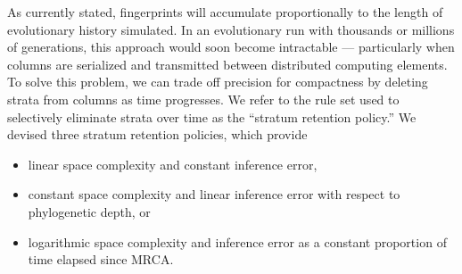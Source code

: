 As currently stated, fingerprints will accumulate proportionally to the length of evolutionary history simulated.
In an evolutionary run with thousands or millions of generations, this approach would soon become intractable --- particularly when columns are serialized and transmitted between distributed computing elements.
To solve this problem, we can trade off precision for compactness by deleting strata from columns as time progresses.
%
%
We refer to the rule set used to selectively eliminate strata over time as the ``stratum retention policy.''
We devised three stratum retention policies, which provide
\begin{itemize}
  \item linear space complexity and constant inference error,
  \item constant space complexity and linear inference error with respect to phylogenetic depth, or
  \item logarithmic space complexity and inference error as a constant proportion of time elapsed since MRCA.
\end{itemize}


